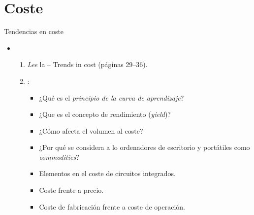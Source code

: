 \section{Coste}

\begin{frame}[t]{Tendencias en coste}
\begin{itemize}
  \item {}
    \begin{enumerate}
      \item \emph{Lee} la  -- Trends in cost (páginas 29--36).\\
            \bibhennessy

      \item {}:
        \begin{itemize}
          \item ¿Qué es el \emph{principio de la curva de aprendizaje}?
          \item ¿Que es el concepto de rendimiento (\emph{yield})?
          \item ¿Cómo afecta el volumen al coste?
          \item ¿Por qué se considera a lo ordenadores de escritorio y portátiles como
                \emph{commodities}?
          \item Elementos en el coste de circuitos integrados.
          \item Coste frente a precio.
          \item Coste de fabricación frente a coste de operación.
        \end{itemize}
    \end{enumerate}
\end{itemize}
\end{frame}
